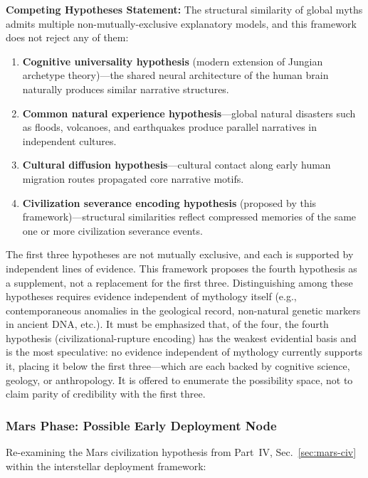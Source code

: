 \documentclass[aps,prd,twocolumn,superscriptaddress,nofootinbib]{revtex4-2}
\begin{document}
\textbf{Competing Hypotheses Statement:} The structural similarity of global myths admits multiple non-mutually-exclusive explanatory models, and this framework does not reject any of them:

\begin{enumerate}
  \item \textbf{Cognitive universality hypothesis} (modern extension of Jungian archetype theory)---the shared neural architecture of the human brain naturally produces similar narrative structures.
  \item \textbf{Common natural experience hypothesis}---global natural disasters such as floods, volcanoes, and earthquakes produce parallel narratives in independent cultures.
  \item \textbf{Cultural diffusion hypothesis}---cultural contact along early human migration routes propagated core narrative motifs.
  \item \textbf{Civilization severance encoding hypothesis} (proposed by this framework)---structural similarities reflect compressed memories of the same one or more civilization severance events.
\end{enumerate}

The first three hypotheses are not mutually exclusive, and each is supported by independent lines of evidence. This framework proposes the fourth hypothesis as a supplement, not a replacement for the first three. Distinguishing among these hypotheses requires evidence independent of mythology itself (e.g., contemporaneous anomalies in the geological record, non-natural genetic markers in ancient DNA, etc.). It must be emphasized that, of the four, the fourth hypothesis (civilizational-rupture encoding) has the weakest evidential basis and is the most speculative: no evidence independent of mythology currently supports it, placing it below the first three---which are each backed by cognitive science, geology, or anthropology. It is offered to enumerate the possibility space, not to claim parity of credibility with the first three.

\subsubsection{Mars Phase: Possible Early Deployment Node}\label{sec:mars-phase}

Re-examining the Mars civilization hypothesis from Part~IV, Sec.~\ref{sec:mars-civ} within the interstellar deployment framework:
\end{document}
